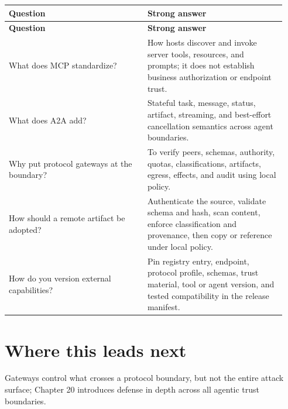 \BookTableStart
\small
\begin{longtable}{@{}Y{0.4700\linewidth}Y{0.4700\linewidth}@{}}
\color{white}\bfseries \textbf{Question} & \color{white}\bfseries \textbf{Strong answer} \\
\endfirsthead
{}
\color{white}\bfseries \textbf{Question} & \color{white}\bfseries \textbf{Strong answer} \\
\endhead
What does MCP standardize? & How hosts discover and invoke server tools, resources, and prompts; it does not establish business authorization or endpoint trust. \\
What does A2A add? & Stateful task, message, status, artifact, streaming, and best-effort cancellation semantics across agent boundaries. \\
Why put protocol gateways at the boundary? & To verify peers, schemas, authority, quotas, classifications, artifacts, egress, effects, and audit using local policy. \\
How should a remote artifact be adopted? & Authenticate the source, validate schema and hash, scan content, enforce classification and provenance, then copy or reference under local policy. \\
How do you version external capabilities? & Pin registry entry, endpoint, protocol profile, schemas, trust material, tool or agent version, and tested compatibility in the release manifest. \\
\end{longtable}
\BookTableEnd

\section{Where this leads next}

Gateways control what crosses a protocol boundary, but not the entire attack surface; Chapter 20 introduces defense in depth across all agentic trust boundaries.\par


